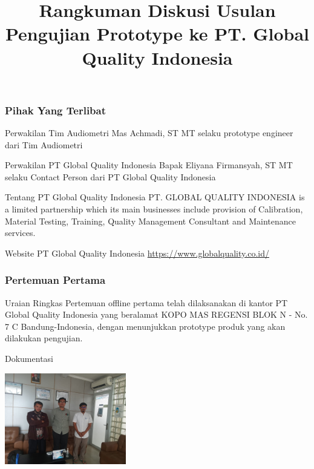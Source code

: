 \documentclass[table,dvipsnames]{beamer}
\title[Rangkuman Kegiatan]{Rangkuman Diskusi Usulan Pengujian Prototype ke PT. Global Quality Indonesia}
\author{}
\institute[VibrasticLab : \ccbysa]{
	Achmadi ST MT\\
	\medskip
	\textit{}
}
\date{}
\begin{document}
	\begin{frame}
		\titlepage
	\end{frame}

	\begin{frame}
		\frametitle{Pihak Yang Terlibat}

		\begin{exampleblock}{Perwakilan Tim Audiometri}
			Mas Achmadi, ST MT selaku prototype engineer dari Tim Audiometri
		\end{exampleblock}

		\begin{exampleblock}{Perwakilan PT Global Quality Indonesia}
			Bapak Eliyana Firmansyah, ST MT selaku Contact Person dari PT Global Quality Indonesia
		\end{exampleblock}

		\begin{exampleblock}{Tentang PT Global Quality Indonesia}
			PT. GLOBAL QUALITY INDONESIA is a limited partnership which its main businesses include provision of Calibration, Material Testing, Training, Quality Management Consultant and Maintenance services.
		\end{exampleblock}

		\begin{exampleblock}{Website PT Global Quality Indonesia}
			\url{https://www.globalquality.co.id/}
		\end{exampleblock}
	\end{frame}

	\begin{frame}
		\frametitle{Pertemuan Pertama}

		\begin{exampleblock}{Uraian Ringkas}
			Pertemuan offline pertama telah dilaksanakan di kantor PT Global Quality Indonesia yang beralamat KOPO MAS REGENSI BLOK N - No. 7 C Bandung-Indonesia,
			dengan menunjukkan prototype produk yang akan dilakukan pengujian.
		\end{exampleblock}

		\begin{exampleblock}{Dokumentasi}
			\begin{center}
				\includegraphics[width=150pt]{images/doc0}
			\end{center}
		\end{exampleblock}
	\end{frame}
\end{document}
